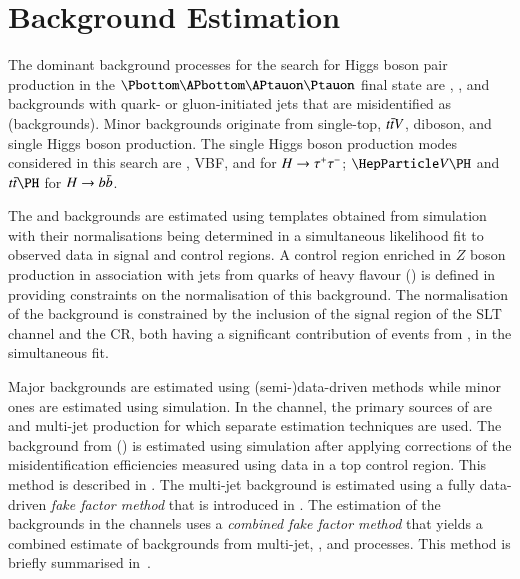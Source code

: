 \section{Background Estimation}%
\label{sec:background_estimation}

The dominant background processes for the search for Higgs boson pair
production in the $\bbtautau$ final state are \ttbar, \Zjets, and
backgrounds with quark- or gluon-initiated jets that are misidentified
as \tauhadvis (\faketauhadvis backgrounds).
Minor backgrounds originate from single-top, $t\bar{t} V$,
diboson, and single Higgs boson production.  The single Higgs boson
production modes considered in this search are \ggF, VBF, \VH and \ttH
for $H \to \tau^{+} \tau^{-}$; $\VH$ and $\ttH$ for $H \to b\bar{b}$.

The \Zjets and \ttbar backgrounds are estimated using templates
obtained from simulation with their normalisations being determined in
a simultaneous likelihood fit to observed data in signal and control
regions. A control region enriched in $Z$ boson production in
association with jets from quarks of heavy flavour (\ZHF) is defined
in  providing constraints on the normalisation of
this background. The normalisation of the \ttbar background is
constrained by the inclusion of the signal region of the \lephad SLT
channel and the \ZHF CR, both having a significant contribution of
events from \ttbar, in the simultaneous fit.

Major \faketauhadvis backgrounds are estimated using
(semi-)data-driven methods while minor ones are estimated using
simulation. In the \hadhad channel, the primary sources of
\faketauhadvis are \ttbar and multi-jet production for which separate
estimation techniques are used. The \faketauhadvis background from
\ttbar (\ttbarFakes) is estimated using simulation after applying
corrections of the \jettotauhadvis misidentification efficiencies
measured using data in a top control region. This method is described
in .  The multi-jet background is
estimated using a fully data-driven \emph{fake factor method} that is
introduced in . The estimation of the
\faketauhadvis backgrounds in the \lephad channels uses a
\emph{combined fake factor method} that yields a combined estimate of
\faketauhadvis backgrounds from multi-jet, \Wjets, and \ttbar
processes. This method is briefly summarised
in~.

